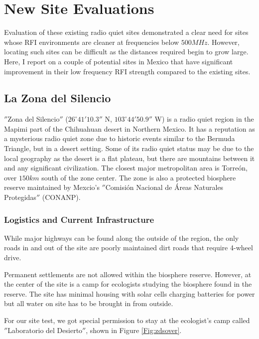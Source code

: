 \section{New Site Evaluations}

Evaluation of these existing radio quiet sites demonstrated a clear need for sites whose RFI environments are cleaner at frequencies below $500 MHz$. However, locating such sites can be difficult as the distances required begin to grow large. Here, I report on a couple of potential sites in Mexico that have significant improvement in their low frequency RFI strength compared to the existing sites. 


\subsection{La Zona del Silencio}

$''$Zona del Silencio$''$ ($26^\circ 41' 10.3''$ N, $103^\circ 44' 50.9''$ W) is a radio quiet region in the Mapimi part of the Chihuahuan desert in Northern Mexico. It has a reputation as a mysterious radio quiet zone due to historic events similar to the Bermuda Triangle, but in a desert setting. Some of its radio quiet status may be due to the local geography as the desert is a flat plateau, but there are mountains between it and any significant civilization. The closest major metropolitan area is Torre\'{o}n, over $150 km$ south of the zone center. The zone is also a protected biosphere reserve maintained by Mexcio's $''$Comisi\'{o}n Nacional de \'{A}reas Naturales Protegidas$''$ (CONANP). 

\subsubsection{Logistics and Current Infrastructure}

While major highways can be found along the outside of the region, the only roads in and out of the site are poorly maintained dirt roads that require 4-wheel drive.

Permanent settlements are not allowed within the biosphere reserve. However, at the center of the site is a camp for ecologists studying the biosphere found in the reserve. The site has minimal housing with solar cells charging batteries for power but all water on site has to be brought in from outside. 

For our site test, we got special permission to stay at the ecologist's camp called $''$Laboratorio del Desierto$''$, shown in Figure \ref{Fig:zdsover}.

